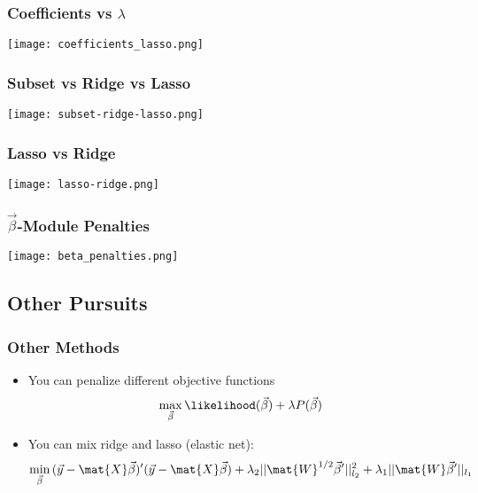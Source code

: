 \documentclass[mathserif, xcolor=table, svgnames]{beamer}
\begin{document}
\begin{frame}
  \frametitle{Coefficients vs $\lambda$}
  \begin{center}
    \texttt{[image: coefficients\_lasso.png]}
  \end{center}
\end{frame}

\begin{frame}
  \frametitle{Subset vs Ridge vs Lasso}
  \begin{center}
    \texttt{[image: subset-ridge-lasso.png]}
  \end{center}
\end{frame}

\begin{frame}
  \frametitle{Lasso vs Ridge}
  \begin{center}
    \texttt{[image: lasso-ridge.png]}
  \end{center}
\end{frame}

\begin{frame}
  \frametitle{$\vec{\beta}$-Module Penalties}
  \begin{center}
    \texttt{[image: beta\_penalties.png]}
  \end{center}
\end{frame}

\subsection{Other Pursuits}
\frame{\tableofcontents[currentsubsection]}

\begin{frame}
  \frametitle{Other Methods}
  \begin{itemize}
  \item You can penalize different objective functions
    \begin{equation*}
      \max_{\vec{\beta}} \likelihood(\vec{\beta}) + \lambda P(\vec{\beta})
    \end{equation*}
  \item You can mix ridge and lasso (elastic net):
    \begin{equation*}
      \min_{\vec{\beta}} \, (\vec{y} - \mat{X}\vec{\beta})'(\vec{y} - \mat{X}\vec{\beta})
      + 
      \lambda_{2} || \mat{W}^{1/2} \vec{\beta}' ||_{l_{2}}^{2}
      +
      \lambda_{1} || \mat{W} \vec{\beta}' ||_{l_{1}}
    \end{equation*}
  \end{itemize}
\end{frame}
\end{document}
